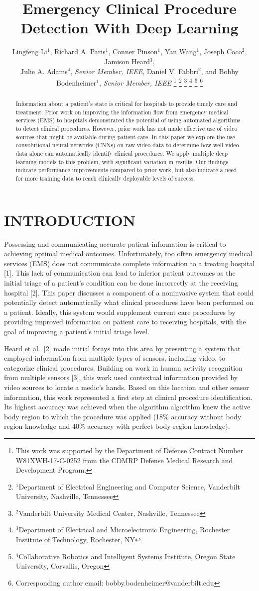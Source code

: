 \documentclass[letterpaper, 10 pt, conference]{ieeeconf}  %
\title{\LARGE \bf
Emergency Clinical Procedure Detection With Deep Learning
}
\author{Lingfeng Li$^{1}$, Richard A. Paris$^{1}$, Conner Pinson$^1$, Yan Wang$^1$, Joseph Coco$^2$, Jamison Heard$^3$,\\
Julie A. Adams$^4$, \textit{Senior Member, IEEE}, Daniel V. Fabbri$^{2}$, and Bobby Bodenheimer$^{1}$, \textit{Senior Member, IEEE}
\thanks{This work was supported by the Department of Defense Contract Number W81XWH-17-C-0252 from the CDMRP Defense Medical Research and Development Program.}%
\thanks{$^{1}$Department of Electrical Engineering and Computer Science,
        Vanderbilt University, Nashville, Tennessee
        }%
\thanks{$^{2}$Vanderbilt University Medical Center, Nashville, Tennessee
        }%
\thanks{$^{3}$Department of Electrical and Microelectronic Engineering, Rochester Institute of Technology, Rochester, NY
        }%
\thanks{$^{4}$Collaborative Robotics and Intelligent Systems Institute, Oregon State University, Corvallis, Oregon
        }%
\thanks{Corresponding author email: bobby.bodenheimer@vanderbilt.edu}
}
\begin{document}
\maketitle
\thispagestyle{empty}
\pagestyle{empty}


\begin{abstract}

Information about a patient’s state is critical for hospitals to provide timely care and treatment. Prior work on improving the information flow from emergency medical services (EMS) to hospitals demonstrated the potential of using automated algorithms to detect clinical procedures. However, prior work has not made effective use of video sources that might be available during patient care. In this paper we explore the use convolutional neural networks (CNNs) on raw video data to determine how well video data alone can automatically identify clinical procedures. We apply multiple deep learning models to this problem, with significant variation in results. Our findings indicate performance improvements compared to prior work, but also indicate a need for more training data to reach clinically deployable levels of success. 

\end{abstract}

\section{INTRODUCTION}

Possessing and communicating accurate patient information is critical to achieving optimal medical outcomes. Unfortunately, too often emergency medical services (EMS) does not communicate complete information to a treating hospital [1]. This lack of communication can lead to inferior patient outcomes as the initial triage of a patient's condition can be done incorrectly at the receiving hospital [2]. This paper discusses a component of a noninvasive system that could potentially detect automatically what clinical procedures have been performed on a patient. Ideally, this system would supplement current care procedures by providing improved information on patient care to receiving hospitals, with the goal of improving a patient's initial triage level.

Heard et al.~[2] made initial forays into this area by presenting a system that employed information from multiple types of sensors, including video, to categorize clinical procedures. Building on work in human activity recognition from multiple sensors [3], this work used contextual information provided by video sources to locate a medic's hands.  Based on this location and other sensor information, this work represented a first step at clinical procedure identification. Its highest accuracy was achieved when the algorithm algorithm knew the active body region to which the procedure was applied (18\% accuracy without body region knowledge and 40\% accuracy with perfect body region knowledge).
\end{document}

